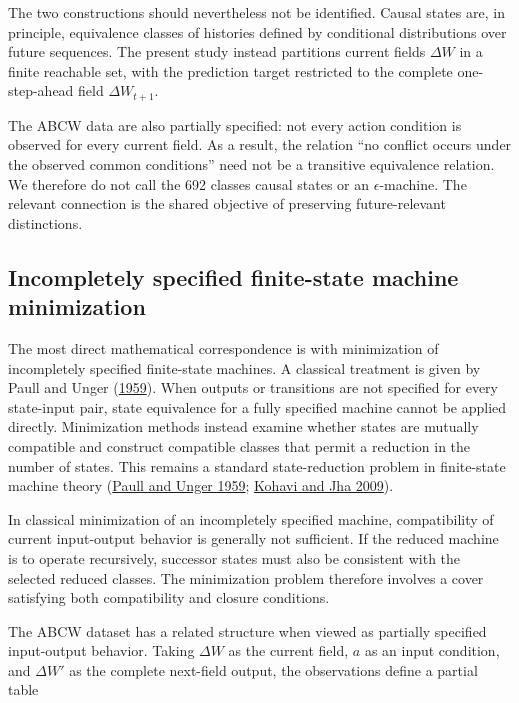 \documentclass[
  11pt,
]{article}
\begin{document}
The two constructions should nevertheless not be identified. Causal
states are, in principle, equivalence classes of histories defined by
conditional distributions over future sequences. The present study
instead partitions current fields \({\Delta W}\) in a finite reachable
set, with the prediction target restricted to the complete
one-step-ahead field \({\Delta W_{t+1}}\).

The ABCW data are also partially specified: not every action condition
is observed for every current field. As a result, the relation ``no
conflict occurs under the observed common conditions'' need not be a
transitive equivalence relation. We therefore do not call the 692
classes causal states or an \({\epsilon}\)-machine. The relevant
connection is the shared objective of preserving future-relevant
distinctions.

\hypertarget{incompletely-specified-finite-state-machine-minimization}{%
\subsection{Incompletely specified finite-state machine
minimization}\label{incompletely-specified-finite-state-machine-minimization}}

The most direct mathematical correspondence is with minimization of
incompletely specified finite-state machines. A classical treatment is
given by Paull and Unger (\protect\hyperlink{ref-paull1959}{1959}). When
outputs or transitions are not specified for every state-input pair,
state equivalence for a fully specified machine cannot be applied
directly. Minimization methods instead examine whether states are
mutually compatible and construct compatible classes that permit a
reduction in the number of states. This remains a standard
state-reduction problem in finite-state machine theory
(\protect\hyperlink{ref-paull1959}{Paull and Unger 1959};
\protect\hyperlink{ref-kohavi2009}{Kohavi and Jha 2009}).

In classical minimization of an incompletely specified machine,
compatibility of current input-output behavior is generally not
sufficient. If the reduced machine is to operate recursively, successor
states must also be consistent with the selected reduced classes. The
minimization problem therefore involves a cover satisfying both
compatibility and closure conditions.

The ABCW dataset has a related structure when viewed as partially
specified input-output behavior. Taking \({\Delta W}\) as the current
field, \({a}\) as an input condition, and \({\Delta W'}\) as the
complete next-field output, the observations define a partial table
\end{document}

